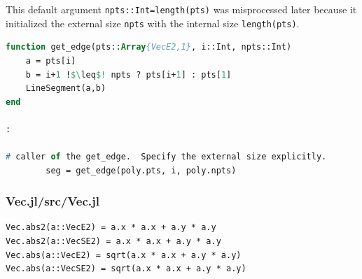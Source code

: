This default argument {\tt npts::Int=length(pts)} was misprocessed later because it initialized the external size {\tt npts} with the internal size {\tt length(pts)}.



\begin{lstlisting}[caption=Changed code 
,label=list:julia_06_automotive, escapechar=!, language=Pascal, frame=single]
function get_edge(pts::Array{VecE2,1}, i::Int, npts::Int)  
    a = pts[i]
    b = i+1 !$\leq$! npts ? pts[i+1] : pts[1]
    LineSegment(a,b)
end

:

# caller of the get_edge.  Specify the external size explicitly.
        seg = get_edge(poly.pts, i, poly.npts)  

\end{lstlisting}


\subsubsection{Vec.jl/src/Vec.jl}


\begin{lstlisting}[caption=Changed code 
,label=list:julia_06_vec, escapechar=!, language=Pascal, frame=single]
Vec.abs2(a::VecE2) = a.x * a.x + a.y * a.y
Vec.abs2(a::VecSE2) = a.x * a.x + a.y * a.y
Vec.abs(a::VecE2) = sqrt(a.x * a.x + a.y * a.y)
Vec.abs(a::VecSE2) = sqrt(a.x * a.x + a.y * a.y)
\end{lstlisting}

